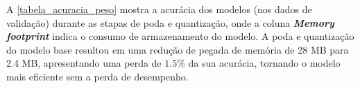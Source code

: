 A \autoref{tabela_acuracia_peso} mostra a acurácia dos modelos (nos dados de validação) durante as etapas de poda e
quantização, onde a coluna \textbf{\textit{Memory footprint}}  indica o consumo de armazenamento do modelo.
A poda e quantização do modelo base resultou em uma redução de pegada de memória de 28 MB para 2.4 MB, apresentando uma perda
de $1.5\%$ da sua acurácia, tornando o modelo mais eficiente sem a perda de desempenho.
